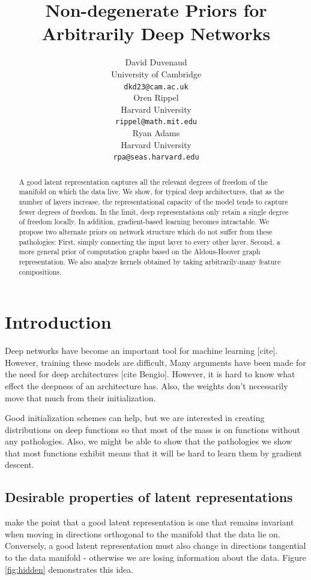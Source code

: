 \documentclass{article}
\title{Non-degenerate Priors for Arbitrarily Deep Networks}
\author{
David Duvenaud \\
University of Cambridge \\
\texttt{dkd23@cam.ac.uk} \\
\And
Oren Rippel \\
Harvard University \\
\texttt{rippel@math.mit.edu} \\
\And
Ryan Adams \\
Harvard University \\
\texttt{rpa@seas.harvard.edu} \\
}
\begin{document}
\maketitle

\begin{abstract}
A good latent representation captures all the relevant degrees of freedom of the manifold on which the data live.  We show, for typical deep architectures, that as the number of layers increase, the representational capacity of the model tends to capture fewer degrees of freedom.  In the limit, deep representations only retain a single degree of freedom locally.  In addition, gradient-based learning becomes intractable.  We propose two alternate priors on network structure which do not suffer from these pathologies:  First, simply connecting the input layer to every other layer.  Second, a more general prior of computation graphs based on the Aldous-Hoover graph representation.  We also analyze kernels obtained by taking arbitrarily-many feature compositions.
\end{abstract}

\section{Introduction}

Deep networks have become an important tool for machine learning [cite].  However, training these models are difficult, Many arguments have been made for the need for deep architectures [cite Bengio].  However, it is hard to know what effect the deepness of an architecture has.  Also, the weights don't necessarily move that much from their initialization.

Good initialization schemes can help, but we are interested in creating distributions on deep functions so that most of the mass is on functions without any pathologies.  Also, we might be able to show that the pathologies we show that most functions exhibit means that it will be hard to learn them by gradient descent.

\subsection{Desirable properties of latent representations}

\cite{rifai2011higher} make the point that a good latent representation is one that remains invariant when moving in directions orthogonal to the manifold that the data lie on.  Conversely, a good latent representation must also change in directions tangential to the data manifold - otherwise we are losing information about the data.  Figure \ref{fig:hidden} demonstrates this idea.
\end{document}
